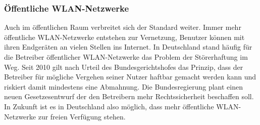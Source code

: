 \begin{multicols}{3}
\subsubsection*{Öffentliche WLAN-Netzwerke}
Auch im öffentlichen Raum verbreitet sich der Standard weiter. Immer mehr öffentliche WLAN-Netzwerke entstehen zur Vernetzung, Benutzer können mit ihren Endgeräten an vielen Stellen ins Internet. In Deutschland stand häufig für die Betreiber öffentlicher WLAN-Netzwerke das Problem der Störerhaftung im Weg. Seit 2010 gilt nach Urteil des Bundesgerichtshofes das Prinzip, dass der Betreiber für mögliche Vergehen seiner Nutzer haftbar gemacht werden kann und riskiert damit mindestens eine Abmahnung. Die Bundesregierung plant einen neuen Gesetzesentwurf der den Betreibern mehr Rechtssicherheit beschaffen soll. In Zukunft ist es in Deutschland also möglich, dass mehr öffentliche WLAN-Netzwerke zur freien Verfügung stehen.
~\cite{basics.10}

\printbibliography[segment=13,heading=subbibliography]

\end{multicols}
\newpage

